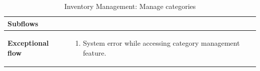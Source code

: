 \documentclass[../thesis.tex]{subfiles}
\begin{document}
\begin{center}
\begin{table}[H]
{\begin{tabular}[htbp]{|p{}|p{}|}
                \textbf{Subflows              }  &                                                                 \\ \hline
                \textbf{Exceptional flow       } & \begin{enumerate}
                                                       \item System error while accessing category management feature.
                                                   \end{enumerate}  \\ \hline
            \end{tabular}%
        }
        \caption{Inventory Management: Manage categories}
        \label{tab:table-usecase-manage-categories}


    \end{table}
\end{center}
\end{document}
